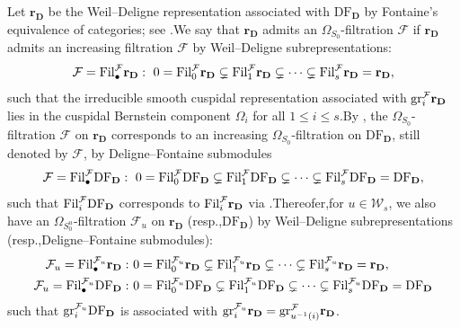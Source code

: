 \documentclass[10pt]{article}
\newcommand{\fil}{{\rm Fil}}
\newcommand{\df}{{\mathrm{DF}}}
\newcommand{\wdre}{{\textbf{r}}}
\newcommand{\gr}{{\rm gr}}
\newcommand{\Dpik}{{\mathbf{D}}}
\newcommand{\omepik}{\Omega_{S^u_0}}
\newcommand{\cF}{\mathcal F}
\newcommand{\sW}{\mathscr W}
\begin{document}
Let $\wdre_{\Dpik}$ be the Weil--Deligne representation associated with $\df_{\Dpik}$ by Fontaine's equivalence of categories; see \cite[Proposition 4.1]{breuil2007first}.\;We say that $\wdre_{\Dpik}$ admits an $\Omega_{S_0}$-filtration $\cF$ if $\wdre_{\Dpik}$ admits an increasing filtration $\cF$ by Weil--Deligne subrepresentations:
\[\cF=\fil_{\bullet}^{\cF} \wdre_{\Dpik}: \ 0 =\fil_0^{\cF} \wdre_{\Dpik} \subsetneq \fil_1^{\cF} \wdre_{\Dpik} \subsetneq \cdots \subsetneq \fil_{s}^{\cF} \wdre_{\Dpik}=\wdre_{\Dpik},\]
such that the irreducible smooth cuspidal representation associated with $\gr^{\cF}_{i}\wdre_{\Dpik}$ lies in the cuspidal Bernstein component $\Omega_{i}$ for all $1\leqslant i\leqslant s$.\;By \cite[Proposition 4.1]{breuil2007first}, the $\Omega_{S_0}$-filtration $\cF$ on $\wdre_{\Dpik}$ corresponds to an increasing $\Omega_{S_0}$-filtration on $\df_{\Dpik}$, still denoted by $\cF$, by Deligne--Fontaine submodules
\[\cF=\fil_{\bullet}^{\cF}\df_{\Dpik}: \ 0 =\fil_0^{\cF} \df_{\Dpik} \subsetneq \fil_1^{\cF} \df_{\Dpik} \subsetneq \cdots \subsetneq \fil_{s}^{\cF} \df_{\Dpik}=\df_{\Dpik},\]
such that $\fil_{i}^{\cF} \df_{\Dpik}$ corresponds to $\fil_{i}^{\cF} \wdre_{\Dpik}$ via \cite[Proposition 4.1]{breuil2007first}.\;Thereofer,\;for $u\in\sW_s$, we also have an $\omepik$-filtration $\cF_u$ on $\wdre_{\Dpik}$ (resp.,\;$\df_{\Dpik}$) by Weil--Deligne subrepresentations (resp.,\;Deligne--Fontaine submodules):
\begin{equation}
	\begin{aligned}
		\cF_u=\fil_{\bullet}^{\cF_u} \wdre_{\Dpik}: &\ 0 =\fil_0^{\cF_u} \wdre_{\Dpik} \subsetneq \fil_1^{\cF_u}\wdre_{\Dpik} \subsetneq \cdots \subsetneq \fil_{s}^{\cF_u} \wdre_{\Dpik}=\wdre_{\Dpik},\\
		\cF_u=\fil_{\bullet}^{\cF_u}\df_{\Dpik}: &\ 0 =\fil_0^{\cF_u} \df_{\Dpik} \subsetneq \fil_1^{\cF_u} \df_{\Dpik} \subsetneq \cdots \subsetneq \fil_{s}^{\cF_u} \df_{\Dpik}=\df_{\Dpik}
	\end{aligned}
\end{equation}
such that $\gr_{i}^{\cF_u} \df_{\Dpik}$ is associated with $\gr_{i}^{\cF_u} \wdre_{\Dpik}=\gr_{u^{-1}(i)}^{\cF}\wdre_{\Dpik}$.\;
\end{document}
